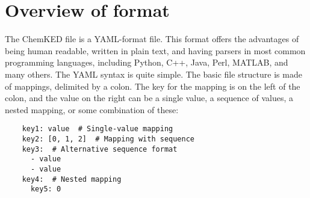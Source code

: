 \documentclass[12pt]{ussci}
\newcommand\ck{ChemKED}
\begin{document}
\section{Overview of format}\label{sec:overview-of-format}

The \ck{} file is a YAML-format file. This format offers the advantages of being
human readable, written in plain text, and having parsers in most common
programming languages, including Python, C++, Java, Perl, MATLAB, and many
others. The YAML syntax is quite simple. The basic file structure is made of
mappings, delimited by a colon. The key for the mapping is on the left of the
colon, and the value on the right can be a single value, a sequence of values,
a nested mapping, or some combination of these:

\begin{verbatim}
    key1: value  # Single-value mapping
    key2: [0, 1, 2]  # Mapping with sequence
    key3:  # Alternative sequence format
      - value
      - value
    key4:  # Nested mapping
      key5: 0
\end{verbatim}
\end{document}
